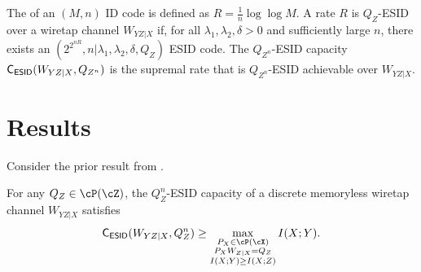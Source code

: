 \documentclass[conference,final]{IEEEtran}
\begin{document}
The  of an $(M, n)$ ID code is defined as
$R = \frac{1}{n} \log\log M$.
A rate $R$ is $Q_Z$-ESID  over a wiretap channel $W_{YZ|X}$
if, for all $\lambda_1, \lambda_2, \delta > 0$
and sufficiently large $n$,
there exists an $(2^{2^{nR}}, n | \lambda_1,\lambda_2, \delta, Q_Z)$ ESID code.
The $Q_{Z^n}$-ESID capacity $\textsf{C}_\textsf{ESID}(W_{YZ|X}, Q_{Z^n})$
is the supremal rate that is $Q_{Z^n}$-ESID achievable over $W_{YZ|X}$.

\section{Results}
\label{sec:results}

Consider the prior result from \cite{IbrahimFerraraDeppe2021IdentificationEffectiveSecrecy_conference}.
\begin{proposition}
  \label{prop:achiev.X}
  For any $Q_Z \in \cP(\cZ)$,
  the $Q_Z^n$-ESID capacity of a discrete memoryless wiretap channel $W_{YZ|X}$ satisfies
  \begin{gather}
    \capESID(W_{YZ|X}, Q_Z^n)
    \ge
      \max_{\substack{
        P_X \in \cP(\cX)
        \\ P_X W_{Z|X} = Q_Z
        \\ I(X; Y) \ge I(X; Z)
      }}
      I(X; Y).
  \end{gather}
\end{proposition}
\end{document}
